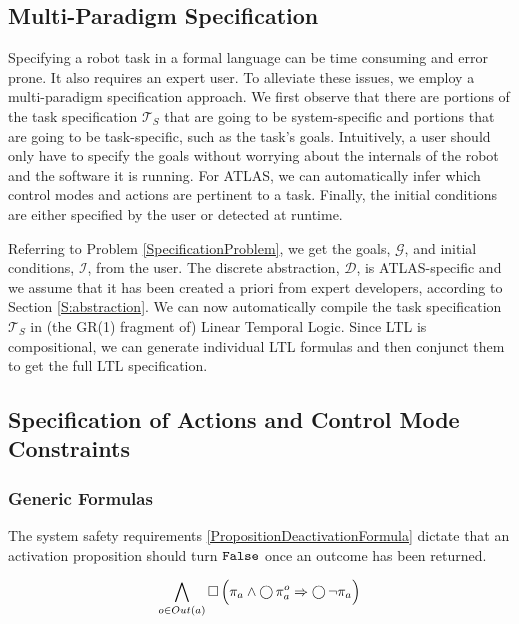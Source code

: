 
\subsection{Multi-Paradigm Specification}

Specifying a robot task in a formal language can be time consuming and error prone. It also requires an expert user.
To alleviate these issues, we employ a multi-paradigm specification approach. 
We first observe that there are portions of the task specification $\mathcal{T}_S$ that are going to be system-specific and portions that are going to be task-specific, such as the task's goals.
Intuitively, a user should only have to specify the goals without worrying about the internals of the robot and the software it is running.
For ATLAS, we can automatically infer which control modes and actions are pertinent to a task.
Finally, the initial conditions are either specified by the user or detected at runtime.

Referring to Problem \ref{SpecificationProblem}, we get the goals, $\mathcal{G}$, and initial conditions, $\mathcal{I}$, from the user.
The discrete abstraction, $\mathcal{D}$, is ATLAS-specific and we assume that it has been created a priori from expert developers, according to Section \ref{S:abstraction}.
We can now automatically compile the task specification $\mathcal{T}_S$ in (the GR(1) fragment \cite{piterman_06} of) Linear Temporal Logic.
Since LTL is compositional, we can generate individual LTL formulas and then conjunct them to get the full LTL specification.

\subsection{Specification of Actions and Control Mode Constraints}

\subsubsection{Generic Formulas}

The system safety requirements \eqref{PropositionDeactivationFormula} dictate that an activation proposition should turn $\mathtt{False}$ once an outcome has been returned.

\begin{equation}\label{PropositionDeactivationFormula}
	\bigwedge \limits_{o \in Out(a)} \operatorname{\Box} \Big( \pi_a \wedge \operatorname{\bigcirc} \pi_a^o \Rightarrow \operatorname{\bigcirc} \lnot \pi_a \Big)
\end{equation}

